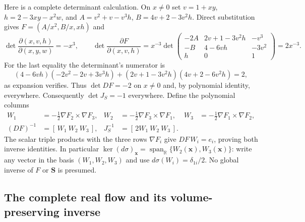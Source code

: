 Here is a complete determinant calculation. On $x\ne0$ set
$v=1+xy$, $h=2-3xy-x^2w$, and
$A=v^2+v-v^3h$, $B=4v+2-3v^2h$. Direct substitution gives
$F=(A/x^2,B/x,xh)$ and
\[
 \det\frac{\partial(x,v,h)}{\partial(x,y,w)}=-x^3,\qquad
 \det\frac{\partial F}{\partial(x,v,h)}
 =x^{-3}\det\begin{pmatrix}
 -2A&2v+1-3v^2h&-v^3\\
 -B&4-6vh&-3v^2\\h&0&1
 \end{pmatrix}=2x^{-3}.
\]
For the last equality the determinant's numerator is
\[
 (4-6vh)(-2v^2-2v+3v^3h)
 +(2v+1-3v^2h)(4v+2-6v^2h)=2,
\]
as expansion verifies. Thus $\det DF=-2$ on $x\ne0$ and,
by polynomial identity, everywhere. Consequently
$\det J_S=-1$ everywhere. Define the polynomial columns
\begin{equation}
\begin{aligned}
 W_1&=-\tfrac12\nabla F_2\times\nabla F_3,&
 W_2&=-\tfrac12\nabla F_3\times\nabla F_1,&
 W_3&=-\tfrac12\nabla F_1\times\nabla F_2,\\
 (DF)^{-1}&=[\,W_1\ W_2\ W_3\,],&
 J_S^{-1}&=[\,2W_1\ W_2\ W_3\,].
\end{aligned}
\label{eq:cq-NS-original-inverse}
\end{equation}
The scalar triple products with the three rows $\nabla F_i$
give $DF\,W_i=e_i$, proving both inverse identities.
In particular $\ker(d\sigma)_{\mathbf x}
=\operatorname{span}_{\mathbb R}\{W_2(\mathbf x),W_3(\mathbf x)\}$:
write any vector in the basis $(W_1,W_2,W_3)$ and use
$d\sigma(W_i)=\delta_{1i}/2$. No global inverse of $F$ or
$\mathbf S$ is presumed.

\subsection{The complete real flow and its volume-preserving inverse}

